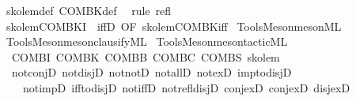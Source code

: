 \begin{isabellebody}
%
\isadelimproof
%
\endisadelimproof
%
\isatagproof
{}\isamarkupfalse%
\ skolem{\isacharunderscore}{\kern0pt}def\ COMBK{\isacharunderscore}{\kern0pt}def\ \isamarkupfalse%
\ {\isacharparenleft}{\kern0pt}rule\ refl{\isacharparenright}{\kern0pt}%
\endisatagproof
{\isafoldproof}%
%
\isadelimproof
\isanewline
%
\endisadelimproof
\isanewline
{}\isamarkupfalse%
\ skolem{\isacharunderscore}{\kern0pt}COMBK{\isacharunderscore}{\kern0pt}I\ {\isacharequal}{\kern0pt}\ iffD{}\ {\isacharbrackleft}{\kern0pt}OF\ skolem{\isacharunderscore}{\kern0pt}COMBK{\isacharunderscore}{\kern0pt}iff{\isacharbrackright}{\kern0pt}%
\isadelimdocument
%
\endisadelimdocument
%
\isatagdocument
%
\isamarkuptrue%
%
\endisatagdocument
{\isafolddocument}%
%
\isadelimdocument
%
\endisadelimdocument
%
\isadelimML
%
\endisadelimML
%
\isatagML
{}\isamarkupfalse%
\ {\isacartoucheopen}Tools{\isacharslash}{\kern0pt}Meson{\isacharslash}{\kern0pt}meson{\isachardot}{\kern0pt}ML{\isacartoucheclose}\isanewline
{}\isamarkupfalse%
\ {\isacartoucheopen}Tools{\isacharslash}{\kern0pt}Meson{\isacharslash}{\kern0pt}meson{\isacharunderscore}{\kern0pt}clausify{\isachardot}{\kern0pt}ML{\isacartoucheclose}\isanewline
{}\isamarkupfalse%
\ {\isacartoucheopen}Tools{\isacharslash}{\kern0pt}Meson{\isacharslash}{\kern0pt}meson{\isacharunderscore}{\kern0pt}tactic{\isachardot}{\kern0pt}ML{\isacartoucheclose}%
\endisatagML
{\isafoldML}%
%
\isadelimML
%
\endisadelimML
\isanewline
\isanewline
{}\isamarkupfalse%
\ {\isacharparenleft}{\kern0pt}\ COMBI\ COMBK\ COMBB\ COMBC\ COMBS\ skolem\isanewline
{}\isamarkupfalse%
\ {\isacharparenleft}{\kern0pt}\ not{\isacharunderscore}{\kern0pt}conjD\ not{\isacharunderscore}{\kern0pt}disjD\ not{\isacharunderscore}{\kern0pt}notD\ not{\isacharunderscore}{\kern0pt}allD\ not{\isacharunderscore}{\kern0pt}exD\ imp{\isacharunderscore}{\kern0pt}to{\isacharunderscore}{\kern0pt}disjD\isanewline
\ \ \ \ not{\isacharunderscore}{\kern0pt}impD\ iff{\isacharunderscore}{\kern0pt}to{\isacharunderscore}{\kern0pt}disjD\ not{\isacharunderscore}{\kern0pt}iffD\ not{\isacharunderscore}{\kern0pt}refl{\isacharunderscore}{\kern0pt}disj{\isacharunderscore}{\kern0pt}D\ conj{\isacharunderscore}{\kern0pt}exD{}\ conj{\isacharunderscore}{\kern0pt}exD{}\ disj{\isacharunderscore}{\kern0pt}exD\isanewline

\end{isabellebody}
